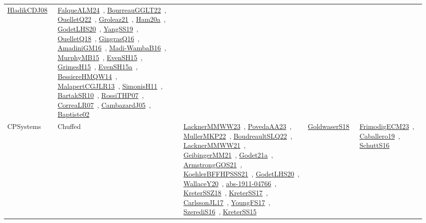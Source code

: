 {\begin{longtable}{lp{3cm}>{\raggedright\arraybackslash}p{6cm}>{\raggedright\arraybackslash}p{6cm}>{\raggedright\arraybackslash}p{8cm}}
\href{../works/HladikCDJ08.pdf}{HladikCDJ08}~\cite{HladikCDJ08} & \href{../works/FalqueALM24.pdf}{FalqueALM24}~\cite{FalqueALM24}, \href{../works/BourreauGGLT22.pdf}{BourreauGGLT22}~\cite{BourreauGGLT22}, \href{../works/OuelletQ22.pdf}{OuelletQ22}~\cite{OuelletQ22}, \href{../works/Groleaz21.pdf}{Groleaz21}~\cite{Groleaz21}, \href{../works/Ham20a.pdf}{Ham20a}~\cite{Ham20a}, \href{../works/GodetLHS20.pdf}{GodetLHS20}~\cite{GodetLHS20}, \href{../works/YangSS19.pdf}{YangSS19}~\cite{YangSS19}, \href{../works/OuelletQ18.pdf}{OuelletQ18}~\cite{OuelletQ18}, \href{../works/GingrasQ16.pdf}{GingrasQ16}~\cite{GingrasQ16}, \href{../works/AmadiniGM16.pdf}{AmadiniGM16}~\cite{AmadiniGM16}, \href{../works/Madi-WambaB16.pdf}{Madi-WambaB16}~\cite{Madi-WambaB16}, \href{../works/MurphyMB15.pdf}{MurphyMB15}~\cite{MurphyMB15}, \href{../works/EvenSH15.pdf}{EvenSH15}~\cite{EvenSH15}, \href{../works/GrimesH15.pdf}{GrimesH15}~\cite{GrimesH15}, \href{../works/EvenSH15a.pdf}{EvenSH15a}~\cite{EvenSH15a}, \href{../works/BessiereHMQW14.pdf}{BessiereHMQW14}~\cite{BessiereHMQW14}, \href{../works/MalapertCGJLR13.pdf}{MalapertCGJLR13}~\cite{MalapertCGJLR13}, \href{../works/SimonisH11.pdf}{SimonisH11}~\cite{SimonisH11}, \href{../works/BartakSR10.pdf}{BartakSR10}~\cite{BartakSR10}, \href{../works/RossiTHP07.pdf}{RossiTHP07}~\cite{RossiTHP07}, \href{../works/CorreaLR07.pdf}{CorreaLR07}~\cite{CorreaLR07}, \href{../works/CambazardJ05.pdf}{CambazardJ05}~\cite{CambazardJ05}, \href{../works/Baptiste02.pdf}{Baptiste02}~\cite{Baptiste02}\\
\index{Chuffed}\index{CPSystems!Chuffed}CPSystems & Chuffed & \href{../works/LacknerMMWW23.pdf}{LacknerMMWW23}~\cite{LacknerMMWW23}, \href{../works/PovedaAA23.pdf}{PovedaAA23}~\cite{PovedaAA23}, \href{../works/MullerMKP22.pdf}{MullerMKP22}~\cite{MullerMKP22}, \href{../works/BoudreaultSLQ22.pdf}{BoudreaultSLQ22}~\cite{BoudreaultSLQ22}, \href{../works/LacknerMMWW21.pdf}{LacknerMMWW21}~\cite{LacknerMMWW21}, \href{../works/GeibingerMM21.pdf}{GeibingerMM21}~\cite{GeibingerMM21}, \href{../works/Godet21a.pdf}{Godet21a}~\cite{Godet21a}, \href{../works/ArmstrongGOS21.pdf}{ArmstrongGOS21}~\cite{ArmstrongGOS21}, \href{../works/KoehlerBFFHPSSS21.pdf}{KoehlerBFFHPSSS21}~\cite{KoehlerBFFHPSSS21}, \href{../works/GodetLHS20.pdf}{GodetLHS20}~\cite{GodetLHS20}, \href{../works/WallaceY20.pdf}{WallaceY20}~\cite{WallaceY20}, \href{../works/abs-1911-04766.pdf}{abs-1911-04766}~\cite{abs-1911-04766}, \href{../works/KreterSSZ18.pdf}{KreterSSZ18}~\cite{KreterSSZ18}, \href{../works/KreterSS17.pdf}{KreterSS17}~\cite{KreterSS17}, \href{../works/CarlssonJL17.pdf}{CarlssonJL17}~\cite{CarlssonJL17}, \href{../works/YoungFS17.pdf}{YoungFS17}~\cite{YoungFS17}, \href{../works/SzerediS16.pdf}{SzerediS16}~\cite{SzerediS16}, \href{../works/KreterSS15.pdf}{KreterSS15}~\cite{KreterSS15} & \href{../works/GoldwaserS18.pdf}{GoldwaserS18}~\cite{GoldwaserS18} & \href{../works/FrimodigECM23.pdf}{FrimodigECM23}~\cite{FrimodigECM23}, \href{../works/Caballero19.pdf}{Caballero19}~\cite{Caballero19}, \href{../works/SchuttS16.pdf}{SchuttS16}~\cite{SchuttS16}\\

\end{longtable}}
